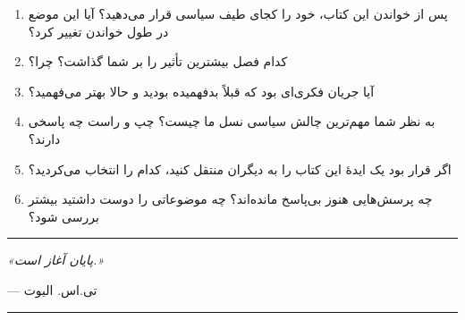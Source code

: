 \begin{tcolorbox}[
    enhanced,
    colback=centergreen!8,
    colframe=centergreen,
    boxrule=1.5pt,
    arc=5pt,
    fonttitle=\bfseries,
    title={\rl{❓ پرسش‌های نهایی برای تأمل}}
]
\begin{enumerate}
    \item پس از خواندن این کتاب، خود را کجای طیف سیاسی قرار می‌دهید؟ آیا این موضع در طول خواندن تغییر کرد؟
    
    \item کدام فصل بیشترین تأثیر را بر شما گذاشت؟ چرا؟
    
    \item آیا جریان فکری‌ای بود که قبلاً بدفهمیده بودید و حالا بهتر می‌فهمید؟
    
    \item به نظر شما مهم‌ترین چالش سیاسی نسل ما چیست؟ چپ و راست چه پاسخی دارند؟
    
    \item اگر قرار بود یک ایدهٔ این کتاب را به دیگران منتقل کنید، کدام را انتخاب می‌کردید؟
    
    \item چه پرسش‌هایی هنوز بی‌پاسخ مانده‌اند؟ چه موضوعاتی را دوست داشتید بیشتر بررسی شود؟
\end{enumerate}
\end{tcolorbox}

\vspace{10mm}
\begin{center}
\rule{0.8\textwidth}{2pt}

\vspace{5mm}
{\Large\textit{«پایان آغاز است.»}}

\vspace{3mm}
--- تی.اس. الیوت

\vspace{5mm}
\rule{0.8\textwidth}{2pt}
\end{center}
